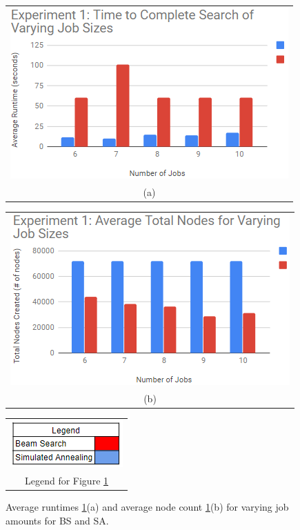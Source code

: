\documentclass[10pt, twocolumn]{article}
\begin{document}
\begin{figure}[!h]
    \centering
    \begin{tabular}[b]{c}
        \includegraphics[width=.90\linewidth]{exp_one_time.png} \\
        \small (a)
    \end{tabular} \qquad
    \begin{tabular}[b]{c}
        \includegraphics[width=.90\linewidth]{exp_one_nodes.png} \\
        \small (b)
    \end{tabular}
     \begin{tabular}[b]{c}
        \includegraphics[width=.3\linewidth]{legend.png} \\
        \small Legend for Figure \ref{exp_one}
    \end{tabular}
    \caption{Average runtimes \ref{exp_one}(a) and average node count \ref{exp_one}(b) for varying job amounts for BS and SA.}  \label{exp_one}
\end{figure}
\end{document}
